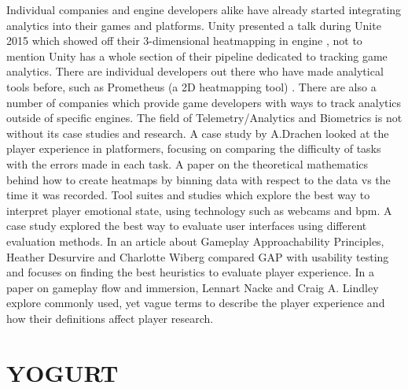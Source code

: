 \documentclass[journal]{IEEEtran}
\begin{document}
Individual companies and engine developers alike have already started integrating analytics into their games and platforms. Unity presented a talk during Unite 2015 which showed off their 3-dimensional heatmapping in engine \cite{unite2015}, not to mention Unity has a whole section of their pipeline dedicated to tracking game analytics. There are individual developers out there who have made analytical tools before, such as Prometheus (a 2D heatmapping tool) \cite{gibbs}. There are also a number of companies which provide game developers with ways to track analytics outside of specific engines. \cite{simpleusability} \cite{drachen} The field of Telemetry/Analytics and Biometrics is not without its case studies and research. A case study by A.Drachen looked at the player experience in platformers, focusing on comparing the difficulty of tasks with the errors made in each task. \cite{wehbe} A paper on the theoretical mathematics behind how to create heatmaps by binning data with respect to the data vs the time it was recorded. \cite{kumatani} Tool suites and studies which explore the best way to interpret player emotional state, using technology such as webcams and bpm. \cite{dingli} A case study explored the best way to evaluate user interfaces using different evaluation methods. \cite{nielsen} In an article about Gameplay Approachability Principles, Heather Desurvire and Charlotte Wiberg compared GAP with usability testing and focuses on finding the best heuristics to evaluate player experience. \cite{desurvire} In a paper on gameplay flow and immersion, Lennart Nacke and Craig A. Lindley explore commonly used, yet vague terms to describe the player experience and how their definitions affect player research. \cite{nacke}


\section{YOGURT}
\end{document}
